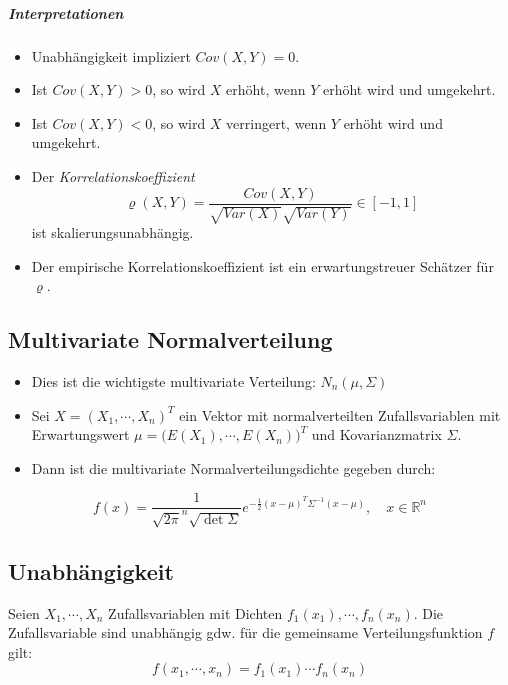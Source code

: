 \documentclass[a4paper, 11pt, accentcolor = tud3b]{tudreport}
\newcommand{\R}{\ensuremath{\mathbb{R}}}
\newcommand{\Var}{\ensuremath{\textit{Var}}}
\newcommand{\Cov}{\ensuremath{\textit{Cov}}}
\begin{document}
	            \subparagraph{Interpretationen}
		            \begin{itemize}
		            	\item Unabhängigkeit impliziert \( \Cov(X, Y) = 0 \).
		            	\item Ist \( \Cov(X, Y) > 0 \), so wird \(X\) erhöht, wenn \(Y\) erhöht wird und umgekehrt.
		            	\item Ist \( \Cov(X, Y) < 0 \), so wird \(X\) verringert, wenn \(Y\) erhöht wird und umgekehrt.
		            	\item Der \textit{Korrelationskoeffizient}
			            	\begin{equation*}
				            	\varrho(X, Y) = \frac{\Cov(X, Y)}{\sqrt{\Var(X)} \sqrt{\Var(Y)}} \in [-1, 1]
			            	\end{equation*}
			            	ist skalierungsunabhängig.
			            \item Der empirische Korrelationskoeffizient ist ein erwartungstreuer Schätzer für \( \varrho \).
		            \end{itemize}

			\subsection{Multivariate Normalverteilung}
				\begin{itemize}
					\item Dies ist die wichtigste multivariate Verteilung: \( N_n(\mu, \Sigma) \)
					\item Sei \( X = (X_1, \cdots, X_n)^T \) ein Vektor mit normalverteilten Zufallsvariablen mit Erwartungswert \( \mu = \big( E(X_1), \cdots, E(X_n) \big)^T \) und Kovarianzmatrix \(\Sigma\).
					\item Dann ist die multivariate Normalverteilungsdichte gegeben durch:
				\end{itemize}
				\begin{equation*}
					f(x) = \frac{1}{\sqrt{2\pi}^n \sqrt{\det \Sigma}} e ^ { -\frac{1}{2} (x - \mu)^T \Sigma^{-1} (x - \mu) }, \quad x \in \R^n
				\end{equation*}

            \subsection{Unabhängigkeit}
                Seien \( X_1, \cdots, X_n \) Zufallsvariablen mit Dichten \( f_1(x_1), \cdots, f_n(x_n) \). Die Zufallsvariable sind unabhängig gdw. für die gemeinsame Verteilungsfunktion \(f\) gilt:
                \begin{equation*}
	                f(x_1, \cdots, x_n) = f_1(x_1) \cdots f_n(x_n)
                \end{equation*}
\end{document}
